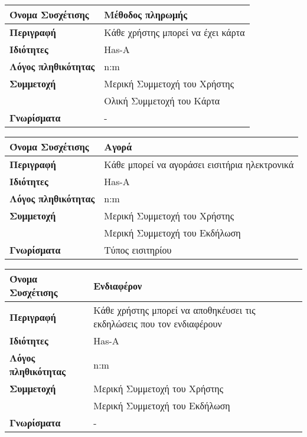 \begin{center}
\begin{tabular}[]{|p{4cm}|p{10cm}|}
  \hline
  \textbf{Όνομα Συσχέτισης} & Μέθοδος πληρωμής\\  \hline
  \textbf{Περιγραφή} & Κάθε χρήστης μπορεί να έχει κάρτα\\ \hline
  \textbf{Ιδιότητες} & Has-A \\ \hline
  \textbf{Λόγος πληθικότητας} & n:m \\ \hline
  \textbf{Συμμετοχή} & Mερική Συμμετοχή του Χρήστης \\ \cline{2-2}
                     & Ολική Συμμετοχή του Κάρτα \\ \hline
  \textbf{Γνωρίσματα} & - \\ \hline
\end{tabular}
\vspace{0.3 cm}

\begin{tabular}[]{|p{4cm}|p{10cm}|}
  \hline
  \textbf{Όνομα Συσχέτισης} & Αγορά\\  \hline
  \textbf{Περιγραφή} & Κάθε μπορεί να αγοράσει εισιτήρια ηλεκτρονικά\\ \hline
  \textbf{Ιδιότητες} & Has-A \\ \hline
  \textbf{Λόγος πληθικότητας} & n:m \\ \hline
  \textbf{Συμμετοχή} & Mερική Συμμετοχή του Χρήστης \\ \cline{2-2}
                     & Μερική Συμμετοχή του Εκδήλωση \\ \hline
  \textbf{Γνωρίσματα} & Τύπος εισιτηρίου\\ \hline
\end{tabular}
\vspace{0.3 cm}

\begin{tabular}[]{|p{4cm}|p{10cm}|}
  \hline
  \textbf{Όνομα Συσχέτισης} & Ενδιαφέρον \\  \hline
  \textbf{Περιγραφή} & Κάθε χρήστης μπορεί να αποθηκέυσει τις εκδηλώσεις που τον ενδιαφέρουν \\ \hline
  \textbf{Ιδιότητες} & Has-A \\ \hline
  \textbf{Λόγος πληθικότητας} & n:m \\ \hline
  \textbf{Συμμετοχή} & Mερική Συμμετοχή του Χρήστης \\ \cline{2-2}
                     & Μερική Συμμετοχή του Εκδήλωση \\ \hline
  \textbf{Γνωρίσματα} & - \\ \hline
\end{tabular}
\vspace{0.3 cm}

\end{center}


